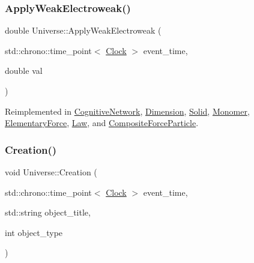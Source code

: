 \subsubsection{\texorpdfstring{Apply\+Weak\+Electroweak()}{ApplyWeakElectroweak()}}
{\footnotesize\ttfamily double Universe\+::\+Apply\+Weak\+Electroweak (\begin{DoxyParamCaption}\item[{std\+::chrono\+::time\+\_\+point$<$ \mbox{\hyperlink{universe_8h_a0ef8d951d1ca5ab3cfaf7ab4c7a6fd80}{Clock}} $>$}]{event\+\_\+time,  }\item[{double}]{val }\end{DoxyParamCaption})\hspace{0.3cm}{\ttfamily [virtual]}}



Reimplemented in \mbox{\hyperlink{classCognitiveNetwork_ab8bc213d2806f0dc49c1284bf934fc24}{Cognitive\+Network}}, \mbox{\hyperlink{classDimension_abf490cabd486afa660f17940ed0d17e6}{Dimension}}, \mbox{\hyperlink{classSolid_ad6c28ec896cbcf64e24a7132a144befd}{Solid}}, \mbox{\hyperlink{classMonomer_a64f65c128ebc2428c42739c930696ea1}{Monomer}}, \mbox{\hyperlink{classElementaryForce_a2d3a5444c771f35d66d4151c62f53b12}{Elementary\+Force}}, \mbox{\hyperlink{classLaw_ae8a5d1d09686d79f7814c8800791460b}{Law}}, and \mbox{\hyperlink{classCompositeForceParticle_a3c1c0b427c633f0685f1d812e02b92ff}{Composite\+Force\+Particle}}.

\mbox{\label{classUniverse_a28615baf47d4558cbe5eebeed6575024}} 
\subsubsection{\texorpdfstring{Creation()}{Creation()}}
{\footnotesize\ttfamily void Universe\+::\+Creation (\begin{DoxyParamCaption}\item[{std\+::chrono\+::time\+\_\+point$<$ \mbox{\hyperlink{universe_8h_a0ef8d951d1ca5ab3cfaf7ab4c7a6fd80}{Clock}} $>$}]{event\+\_\+time,  }\item[{std\+::string}]{object\+\_\+title,  }\item[{int}]{object\+\_\+type }\end{DoxyParamCaption})}

\mbox{\label{classUniverse_a982502e46868a00a9111738ccc9355c2}} 
